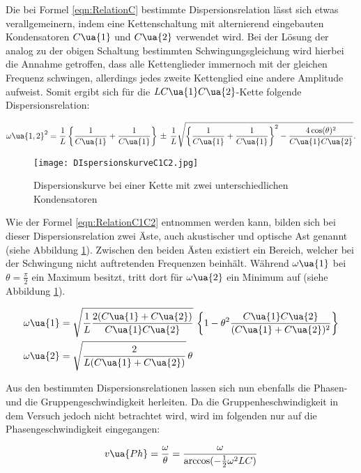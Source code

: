 Die bei Formel \eqref{eqn:RelationC} bestimmte Dispersionsrelation lässt
sich etwas verallgemeinern, indem eine Kettenschaltung  mit alternierend eingebauten
Kondensatoren $C\ua{1}$ und $C\ua{2}$ verwendet wird. Bei der Lösung der analog
zu der obigen Schaltung bestimmten Schwingungsgleichung wird hierbei die Annahme
getroffen, dass alle Kettenglieder immernoch mit der gleichen Frequenz schwingen,
allerdings jedes zweite Kettenglied eine andere Amplitude aufweist. Somit ergibt
sich für die $LC\ua{1}C\ua{2}$-Kette folgende Dispersionsrelation:

\begin{equation}
  \omega\ua{1,2}^2 = \frac{1}{L} \left\{ \frac{1}{C\ua{1}} + \frac{1}{C\ua{1}}
  \right\} \, \pm \, \frac{1}{L} \sqrt{ \left\{ \frac{1}{C\ua{1}} + \frac{1}{C\ua{1}}
  \right\}^2  - \frac{4\cos(\theta)^2}{C\ua{1}C\ua{2}}} .
  \label{eqn:RelationC1C2}
\end{equation}

\begin{figure}
  \texttt{[image: DIspersionskurveC1C2.jpg]}
  \caption{Dispersionskurve bei einer Kette mit zwei unterschiedlichen Kondensatoren \cite{anleitung01}}
  \label{fig:RelationC12}
\end{figure}

Wie der Formel \eqref{eqn:RelationC1C2} entnommen werden kann, bilden sich bei
dieser Dispersionsrelation zwei Äste, auch akustischer und optische Ast genannt
(siehe Abbildung \ref{fig:RelationC12}). Zwischen den beiden Ästen existiert ein Bereich, welcher
bei der Schwingung nicht auftretenden Frequenzen beinhält. Während $\omega\ua{1}$
bei $\theta = \frac{\pi}{2}$ ein Maximum besitzt, tritt dort für $\omega\ua{2}$
ein Minimum auf (siehe Abbildung \ref{fig:RelationC12}).


\begin{align}
  \omega\ua{1} &= \sqrt{ \frac{1}{L} \frac{2(C\ua{1} + C\ua{2})}{C\ua{1}C\ua{2}}} \,
  \left\{ 1 - \theta^2 \frac{C\ua{1}C\ua{2}}{(C\ua{1} + C\ua{2})^2} \right\} \\
  \omega\ua{2} &= \sqrt{ \frac{2}{L(C\ua{1} + C\ua{2})}} \, \theta
\end{align}

Aus den bestimmten Dispersionsrelationen lassen sich nun ebenfalls die Phasen- und
die Gruppengeschwindigkeit herleiten. Da die Gruppenheschwindigkeit in dem Versuch
jedoch nicht betrachtet wird, wird im folgenden nur auf die Phasengeschwindigkeit
eingegangen:

\begin{equation}
  v\ua{Ph} = \frac{\omega}{\theta} = \frac{\omega}{\arccos(-\frac{1}{2}\omega^2LC)}
\end{equation}

